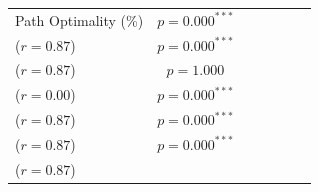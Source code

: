 \begin{table}[htbp]
\begin{tabular}{@{}lcccccc@{}}
Path Optimality (\%) & $p=0.000^{***}$\\($r=0.87$) & $p=0.000^{***}$\\($r=0.87$) & $p=1.000$\\($r=0.00$) & $p=0.000^{***}$\\($r=0.87$) & $p=0.000^{***}$\\($r=0.87$) & $p=0.000^{***}$\\($r=0.87$) \\
\bottomrule
\end{tabular}
\end{table}